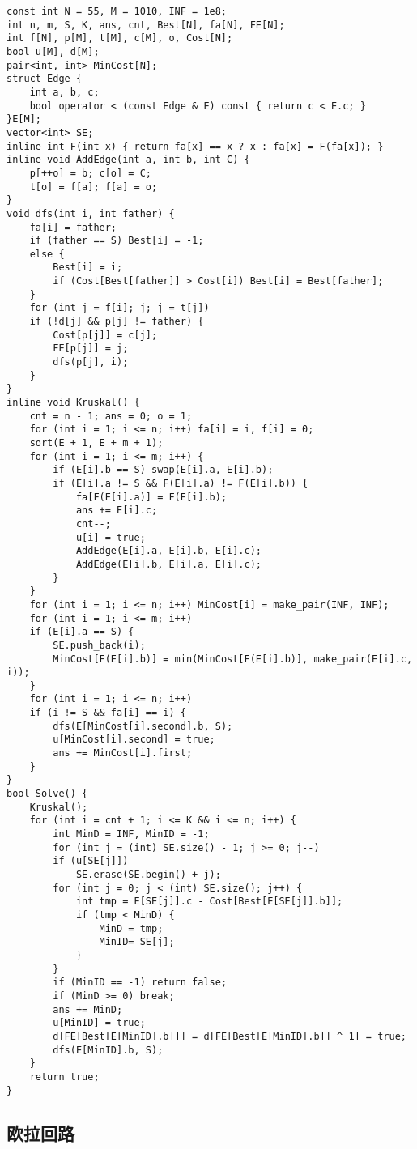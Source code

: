 \documentclass{article}
\begin{document}
\begin{lstlisting}
const int N = 55, M = 1010, INF = 1e8;
int n, m, S, K, ans, cnt, Best[N], fa[N], FE[N];
int f[N], p[M], t[M], c[M], o, Cost[N];
bool u[M], d[M];
pair<int, int> MinCost[N];
struct Edge {
    int a, b, c;
    bool operator < (const Edge & E) const { return c < E.c; }
}E[M];
vector<int> SE;
inline int F(int x) { return fa[x] == x ? x : fa[x] = F(fa[x]); }
inline void AddEdge(int a, int b, int C) {
    p[++o] = b; c[o] = C;
    t[o] = f[a]; f[a] = o;
}
void dfs(int i, int father) {
    fa[i] = father;
    if (father == S) Best[i] = -1;
    else {
        Best[i] = i;
        if (Cost[Best[father]] > Cost[i]) Best[i] = Best[father];
    }
    for (int j = f[i]; j; j = t[j])
    if (!d[j] && p[j] != father) {
        Cost[p[j]] = c[j];
        FE[p[j]] = j;
        dfs(p[j], i);
    }
}
inline void Kruskal() {
    cnt = n - 1; ans = 0; o = 1;
    for (int i = 1; i <= n; i++) fa[i] = i, f[i] = 0;
    sort(E + 1, E + m + 1);
    for (int i = 1; i <= m; i++) {
        if (E[i].b == S) swap(E[i].a, E[i].b);
        if (E[i].a != S && F(E[i].a) != F(E[i].b)) {
            fa[F(E[i].a)] = F(E[i].b);
            ans += E[i].c;
            cnt--;
            u[i] = true;
            AddEdge(E[i].a, E[i].b, E[i].c);
            AddEdge(E[i].b, E[i].a, E[i].c);
        }
    }
    for (int i = 1; i <= n; i++) MinCost[i] = make_pair(INF, INF);
    for (int i = 1; i <= m; i++)
    if (E[i].a == S) {
        SE.push_back(i);
        MinCost[F(E[i].b)] = min(MinCost[F(E[i].b)], make_pair(E[i].c, i));
    }
    for (int i = 1; i <= n; i++)
    if (i != S && fa[i] == i) {
        dfs(E[MinCost[i].second].b, S);
        u[MinCost[i].second] = true;
        ans += MinCost[i].first;
    }
}
bool Solve() {
    Kruskal();
    for (int i = cnt + 1; i <= K && i <= n; i++) {
        int MinD = INF, MinID = -1;
        for (int j = (int) SE.size() - 1; j >= 0; j--)
        if (u[SE[j]])
            SE.erase(SE.begin() + j);
        for (int j = 0; j < (int) SE.size(); j++) {
            int tmp = E[SE[j]].c - Cost[Best[E[SE[j]].b]];
            if (tmp < MinD) {
                MinD = tmp;
                MinID= SE[j];
            }
        }
        if (MinID == -1) return false;
        if (MinD >= 0) break;
        ans += MinD;
        u[MinID] = true;
        d[FE[Best[E[MinID].b]]] = d[FE[Best[E[MinID].b]] ^ 1] = true;
        dfs(E[MinID].b, S);
    }
    return true;
}
\end{lstlisting}

\subsection{欧拉回路}
\end{document}
